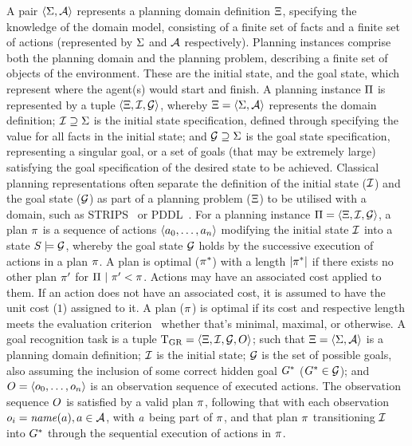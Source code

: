 A pair $\left\langle\Sigma,\mathcal{A}\right\rangle$ represents a planning domain definition $\Xi$, specifying the knowledge of the domain model, consisting of a finite set of facts and a finite set of actions (represented by $\Sigma$ and $\mathcal{A}$ respectively).
Planning instances comprise both the planning domain and the planning problem, describing a finite set of objects of the environment. These are the initial state, and the goal state, which represent where the agent(s) would start and finish.
A planning instance $\Pi$ is represented by a tuple $\left\langle\Xi,\mathcal{I},\mathcal{G}\right\rangle$, whereby $\Xi=\left\langle\Sigma,\mathcal{A}\right\rangle$ represents the domain definition; $\mathcal{I}\supseteq\Sigma$ is the initial state specification, defined through specifying the value for all facts in the initial state; and $\mathcal{G}\supseteq\Sigma$ is the goal state specification, representing a singular goal, or a set of goals (that may be extremely large) satisfying the goal specification of the desired state to be achieved.
Classical planning representations often separate the definition of the initial state ($\mathcal{I}$) and the goal state ($\mathcal{G}$) as part of a planning problem ($\Xi$) to be utilised with a domain, such as STRIPS~\cite{Fikes1971} or PDDL~\cite{PDDL1998}.
For a planning instance $\Pi=\left\langle\Xi,\mathcal{I},\mathcal{G}\right\rangle$, a plan $\pi$ is a sequence of actions $\left\langle a_0,\dots,a_n\right\rangle$ modifying the initial state $\mathcal{I}$ into a state $S\models\mathcal{G}$, whereby the goal state $\mathcal{G}$ holds by the successive execution of actions in a plan $\pi$. A plan is optimal ($\pi^{*}$) with a length $\vert\pi^{*}\vert$ if there exists no other plan $\pi'$ for $\Pi~\vert~ \pi'<\pi$.
Actions may have an associated cost applied to them. If an action does not have an associated cost, it is assumed to  have the unit cost ($1$) assigned to it. 
A plan ($\pi$) is optimal if its cost and respective length meets the evaluation criterion \textemdash~whether that's minimal, maximal, or otherwise.
A goal recognition task is a tuple $\text{T}_{\text{GR}}=\left\langle\Xi,\mathcal{I},\mathcal{G},O\right\rangle$; such that $\Xi=\left\langle\Sigma,\mathcal{A}\right\rangle$ is a planning domain definition; $\mathcal{I}$ is the initial state; $\mathcal{G}$ is the set of possible goals, also assuming the inclusion of some correct hidden goal $G^{*}$ ($G^{*}\in\mathcal{G}$); and $O=\left\langle o_0,\dots,o_n\right\rangle$ is an observation sequence of executed actions. The observation sequence $O$ is satisfied by a valid plan $\pi$, following that with each observation $o_i=\mathit{name}(a), a\in\mathcal{A}$, with $a$ being part of $\pi$, and that plan $\pi$ transitioning $\mathcal{I}$ into $G^{*}$ through the sequential execution of actions in $\pi$.
